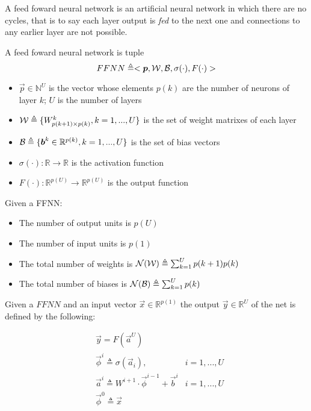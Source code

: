 
A feed foward neural network is an artificial neural network in which there are no cycles, that is to say each layer output is \textit{fed} to the next one and connections to any earlier layer are not possible. 


\begin{defn}
\label{def_ffnn}
A feed foward neural network is tuple
$$FFNN\triangleq<\boldsymbol{p},\mathcal{W},\mathcal{B},\sigma(\cdot),F(\cdot)>$$
\begin{itemize}
 \item $\vec{p} \in \mathbb{N}^U$ is the vector whose elements $p(k)$ are the number of neurons of layer $k$; $U$ is the number of layers
 \item $\mathcal{W} \triangleq \{W^k_{p(k+1) \times p(k)}, k=1,...,U \}$ is the set of weight matrixes of each layer
 \item $\mathcal{B} \triangleq \{\boldsymbol{b}^k \in \mathbb{R}^{p(k)}, k=1,...,U \} $ is the set of bias vectors
 \item $\sigma(\cdot): \mathbb{R}\rightarrow \mathbb{R}$ is the activation function
 \item $F(\cdot): \mathbb{R}^{p(U)}\rightarrow \mathbb{R}^{p(U)}$ is the output function
\end{itemize}
\end{defn}

\begin{remark}{}
Given a FFNN:
\begin{itemize}
 \item The number of output units is $p(U)$
 \item The number of input units is $p(1)$
 \item The total number of weights is $\mathcal{N}(\mathcal{W}) \triangleq \sum_{k=1}^U p(k+1)p(k)$
 \item The total number of biases is $\mathcal{N}(\mathcal{B}) \triangleq \sum_{k=1}^U p(k)$
\end{itemize}
\end{remark}

\begin{defn}
Given a $FFNN$ and an input vector $\vec{x} \in \mathbb{R}^{p(1)}$ the output $\vec{y} \in \mathbb{R}^U$ of the net is defined by the following:

\begin{align}
&\vec{y}=F(\vec{a}^{U}) &\\
&\vec{\phi}^{i} \triangleq \sigma(\vec{a}_{i}), & i=1,...,U\\
&\vec{a}^{i} \triangleq W^{i+1} \cdot \vec{\phi}^{i-1} +\vec{b}^i  & i=1,...,U\\
&\vec{\phi}^{0} \triangleq \vec{x} &
\end{align}
\end{defn}


